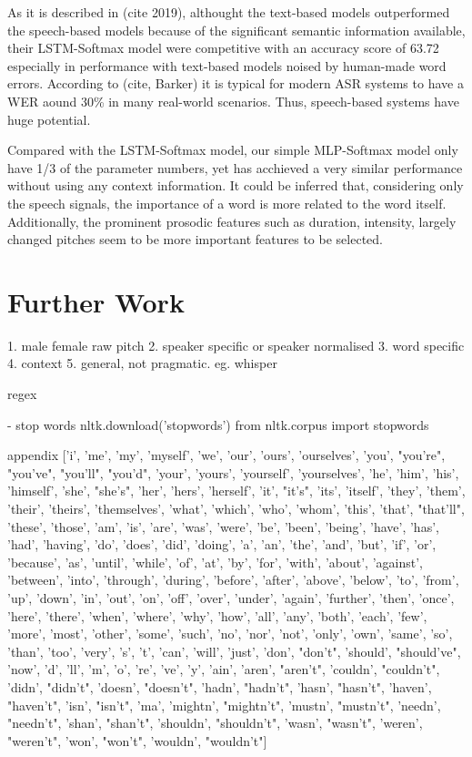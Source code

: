 As it is described in (cite 2019), althought the text-based models outperformed the speech-based models because of the significant semantic information available, their LSTM-Softmax model were competitive with an accuracy score of 63.72 especially in performance with text-based models noised by human-made word errors. According to (cite, Barker) it is typical for modern ASR systems to have a WER aound 30\% in many real-world scenarios. Thus, speech-based systems have huge potential.

Compared with the LSTM-Softmax model, our simple MLP-Softmax model only have 1/3 of the parameter numbers, yet has acchieved a very similar performance without using any context information. It could be inferred that, considering only the speech signals, the importance of a word is more related to the word itself. Additionally, the prominent prosodic features such as duration, intensity, largely changed pitches seem to be more important features to be selected.

\section{Further Work}
1. male female raw pitch
2. speaker specific or speaker normalised
3. word specific
4. context
5. general, not pragmatic.
	eg. whisper

regex

- stop words
nltk.download('stopwords')
from nltk.corpus import stopwords

appendix
['i', 'me', 'my', 'myself', 'we', 'our', 'ours', 'ourselves', 'you', "you're", "you've", "you'll", "you'd", 'your', 'yours', 'yourself', 'yourselves', 'he', 'him', 'his', 'himself', 'she', "she's", 'her', 'hers', 'herself', 'it', "it's", 'its', 'itself', 'they', 'them', 'their', 'theirs', 'themselves', 'what', 'which', 'who', 'whom', 'this', 'that', "that'll", 'these', 'those', 'am', 'is', 'are', 'was', 'were', 'be', 'been', 'being', 'have', 'has', 'had', 'having', 'do', 'does', 'did', 'doing', 'a', 'an', 'the', 'and', 'but', 'if', 'or', 'because', 'as', 'until', 'while', 'of', 'at', 'by', 'for', 'with', 'about', 'against', 'between', 'into', 'through', 'during', 'before', 'after', 'above', 'below', 'to', 'from', 'up', 'down', 'in', 'out', 'on', 'off', 'over', 'under', 'again', 'further', 'then', 'once', 'here', 'there', 'when', 'where', 'why', 'how', 'all', 'any', 'both', 'each', 'few', 'more', 'most', 'other', 'some', 'such', 'no', 'nor', 'not', 'only', 'own', 'same', 'so', 'than', 'too', 'very', 's', 't', 'can', 'will', 'just', 'don', "don't", 'should', "should've", 'now', 'd', 'll', 'm', 'o', 're', 've', 'y', 'ain', 'aren', "aren't", 'couldn', "couldn't", 'didn', "didn't", 'doesn', "doesn't", 'hadn', "hadn't", 'hasn', "hasn't", 'haven', "haven't", 'isn', "isn't", 'ma', 'mightn', "mightn't", 'mustn', "mustn't", 'needn', "needn't", 'shan', "shan't", 'shouldn', "shouldn't", 'wasn', "wasn't", 'weren', "weren't", 'won', "won't", 'wouldn', "wouldn't"]

